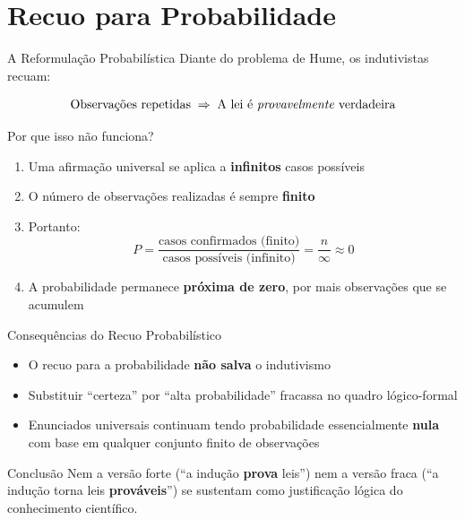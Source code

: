 \documentclass[aspectratio=169]{beamer}
\newcommand{\impt}[1]{\textcolor{maccent}{\textbf{#1}}}
\begin{document}
\section{Recuo para Probabilidade}

\begin{frame}{A Reformulação Probabilística}
  Diante do problema de Hume, os indutivistas recuam:

  \vspace{0.2cm}
  \[
    \text{Observações repetidas} \;\Rightarrow\; \text{A lei é \textit{provavelmente} verdadeira}
  \]

  \vspace{0.3cm}
  \pause
  \begin{alertblock}{Por que isso não funciona?}
    \begin{enumerate}
      \item Uma afirmação universal se aplica a \impt{infinitos} casos possíveis
      \item O número de observações realizadas é sempre \impt{finito}
      \item Portanto:
      \[
        P = \frac{\text{casos confirmados (finito)}}{\text{casos possíveis (infinito)}} = \frac{n}{\infty} \approx 0
      \]
      \item A probabilidade permanece \impt{próxima de zero}, por mais observações que se acumulem
    \end{enumerate}
  \end{alertblock}
\end{frame}

\begin{frame}{Consequências do Recuo Probabilístico}
  \begin{itemize}
    \item O recuo para a probabilidade \impt{não salva} o indutivismo
    \pause
    \item Substituir ``certeza'' por ``alta probabilidade'' fracassa no quadro lógico-formal
    \pause
    \item Enunciados universais continuam tendo probabilidade essencialmente \impt{nula} com base em qualquer conjunto finito de observações
  \end{itemize}

  \vspace{0.4cm}
  \pause
  \begin{block}{Conclusão}
    Nem a versão forte (``a indução \textbf{prova} leis'') nem a versão fraca (``a indução torna leis \textbf{prováveis}'') se sustentam como justificação lógica do conhecimento científico.
  \end{block}
\end{frame}
\end{document}
